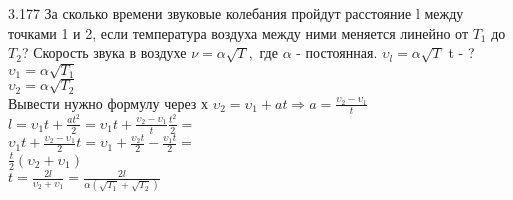 \testCom
{%
	3.177
}
{%
	За сколько времени звуковые колебания пройдут расстояние l между точками 1 и 2, если температура воздуха между ними меняется линейно от ${T}_{1}$ до ${T}_{2}$? Скорость звука в воздухе $\nu = \alpha \sqrt{T},$ где $\alpha$ - постоянная.
}
{%
	${\upsilon}_{l} = \alpha \sqrt{T}$
}
{%
	t - ?
}
{%
	${\upsilon}_{1}=\alpha \sqrt{{T}_{1}}$\\
	${\upsilon}_{2}=\alpha \sqrt{{T}_{2}}$\\
	Вывести нужно формулу через х ${\upsilon}_{2}={\upsilon}_{1} + at \Rightarrow a = \frac{{\upsilon}_{2}-{\upsilon}_{1}}{t}$ \\
	$l = {\upsilon}_{1} t + \frac{at^2}{2} = {\upsilon}_{1} t +  \frac{{\upsilon}_{2}-{\upsilon}_{1}}{t} \frac{t^2}{2}=$\\
	${\upsilon}_{1} t + \frac{{\upsilon}_{2}-{\upsilon}_{1}}{2} t = {\upsilon}_{1}  + \frac{{\upsilon}_{2} t}{2} - \frac{{\upsilon}_{1} t}{2} =$\\
	$\frac{t}{2}({\upsilon}_{2}+{\upsilon}_{1})$\\
	$t = \frac{2 l}{{\upsilon}_{2}+{\upsilon}_{1}}=\frac{2l}{\alpha(\sqrt{{T}_{1}}+\sqrt{{T}_{2}})}$\\	
}


